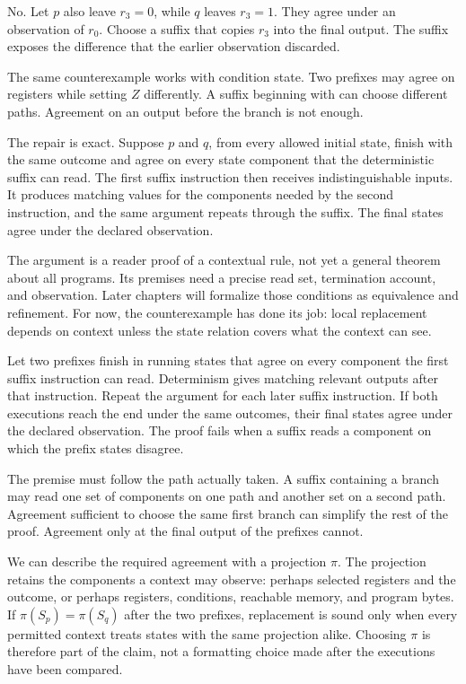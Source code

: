 No. Let \(p\) also leave \(r_3=0\), while \(q\) leaves \(r_3=1\). They agree
under an observation of \(r_0\). Choose a suffix that copies \(r_3\) into the
final output. The suffix exposes the difference that the earlier observation
discarded.

The same counterexample works with condition state. Two prefixes may agree on
registers while setting \(Z\) differently. A suffix beginning with
 can choose different paths. Agreement on an output before the
branch is not enough.

The repair is exact. Suppose \(p\) and \(q\), from every allowed initial
state, finish with the same outcome and agree on every state component that
the deterministic suffix can read. The first suffix instruction then receives
indistinguishable inputs. It produces matching values for the components
needed by the second instruction, and the same argument repeats through the
suffix. The final states agree under the declared observation.

The argument is a reader proof of a contextual rule, not yet a general theorem about
all programs. Its premises need a precise read set, termination account, and
observation. Later chapters will formalize those conditions as equivalence and
refinement. For now, the counterexample has done its job: local replacement
depends on context unless the state relation covers what the context can see.

\begin{proofkit}[title={\iconProofKit\ Replacement through a deterministic suffix}]
Let two prefixes finish in running states that agree on every component the
first suffix instruction can read. Determinism gives matching relevant outputs
after that instruction. Repeat the argument for each later suffix instruction.
If both executions reach the end under the same outcomes, their final states
agree under the declared observation. The proof fails when a suffix reads a
component on which the prefix states disagree.
\end{proofkit}

The premise must follow the path actually taken. A suffix containing a branch
may read one set of components on one path and another set on a second path.
Agreement sufficient to choose the same first branch can simplify the rest of
the proof. Agreement only at the final output of the prefixes cannot.

We can describe the required agreement with a projection \(\pi\). The
projection retains the components a context may observe: perhaps selected
registers and the outcome, or perhaps registers, conditions, reachable memory,
and program bytes. If \(\pi(S_p)=\pi(S_q)\) after the two prefixes, replacement
is sound only when every permitted context treats states with the same
projection alike. Choosing \(\pi\) is therefore part of the claim, not a
formatting choice made after the executions have been compared.

